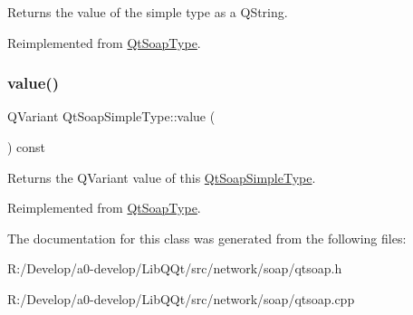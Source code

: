 Returns the value of the simple type as a Q\+String. 

Reimplemented from \mbox{\hyperlink{class_qt_soap_type_a253d268332ea0b2ebba6ee52522fa685}{Qt\+Soap\+Type}}.

\mbox{\label{class_qt_soap_simple_type_aca629cc16e84fcfa083799c756e865db}} 
\subsubsection{\texorpdfstring{value()}{value()}}
{\footnotesize\ttfamily Q\+Variant Qt\+Soap\+Simple\+Type\+::value (\begin{DoxyParamCaption}{ }\end{DoxyParamCaption}) const\hspace{0.3cm}{\ttfamily [virtual]}}

Returns the Q\+Variant value of this \mbox{\hyperlink{class_qt_soap_simple_type}{Qt\+Soap\+Simple\+Type}}. 

Reimplemented from \mbox{\hyperlink{class_qt_soap_type_a2fc88aa456ba9eee2cd74902be50fbb3}{Qt\+Soap\+Type}}.



The documentation for this class was generated from the following files\+:\begin{DoxyCompactItemize}
\item 
R\+:/\+Develop/a0-\/develop/\+Lib\+Q\+Qt/src/network/soap/qtsoap.\+h\item 
R\+:/\+Develop/a0-\/develop/\+Lib\+Q\+Qt/src/network/soap/qtsoap.\+cpp\end{DoxyCompactItemize}
